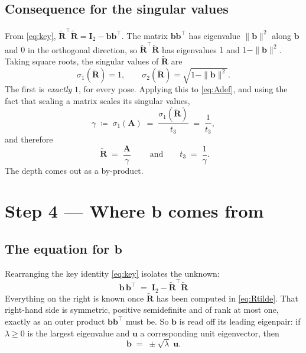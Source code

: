 \documentclass[11pt,a4paper]{article}
\theoremstyle{remark}
\newcommand{\Rtil}{\widetilde{\mathbf{R}}}
\newcommand{\Amat}{\mathbf{A}}
\newcommand{\Idm}{\mathbf{I}}
\newcommand{\bvec}{\mathbf{b}}
\newcommand{\uvec}{\mathbf{u}}
\begin{document}
\subsection{Consequence for the singular values}

From \eqref{eq:key}, $\Rtil^{\top}\Rtil = \Idm_2 - \bvec\bvec^{\top}$. The
matrix $\bvec\bvec^{\top}$ has eigenvalue $\|\bvec\|^2$ along $\bvec$ and $0$ in
the orthogonal direction, so $\Rtil^{\top}\Rtil$ has eigenvalues $1$ and
$1 - \|\bvec\|^2$. Taking square roots, the singular values of $\Rtil$ are
\begin{equation}
  \sigma_1(\Rtil) = 1,
  \qquad
  \sigma_2(\Rtil) = \sqrt{1 - \|\bvec\|^2}.
  \label{eq:sv}
\end{equation}
The first is \emph{exactly} $1$, for every pose. Applying this to
\eqref{eq:Adef}, and using the fact that scaling a matrix scales its singular
values,
\begin{equation}
  \gamma \;\coloneqq\; \sigma_1(\Amat)
  \;=\; \frac{\sigma_1(\Rtil)}{t_3}
  \;=\; \frac{1}{t_3},
  \label{eq:gamma}
\end{equation}
and therefore
\begin{equation}
  \boxed{\;
  \Rtil \;=\; \frac{\Amat}{\gamma}
  \;}
  \qquad \text{and} \qquad
  t_3 \;=\; \frac{1}{\gamma}.
  \label{eq:Rtilde}
\end{equation}
The depth comes out as a by-product.

\section{Step 4 --- Where $\bvec$ comes from}
\label{sec:b}

\subsection{The equation for $\bvec$}

Rearranging the key identity \eqref{eq:key} isolates the unknown:
\begin{equation}
  \boxed{\;
  \bvec\,\bvec^{\top} \;=\; \Idm_2 - \Rtil^{\top}\Rtil
  \;}
  \label{eq:bb}
\end{equation}
Everything on the right is known once $\Rtil$ has been computed in
\eqref{eq:Rtilde}. That right-hand side is symmetric, positive semidefinite and
of rank at most one, exactly as an outer product $\bvec\bvec^{\top}$ must be. So
$\bvec$ is read off its leading eigenpair: if $\lambda \ge 0$ is the largest
eigenvalue and $\uvec$ a corresponding unit eigenvector, then
\begin{equation}
  \bvec \;=\; \pm\sqrt{\lambda}\;\uvec .
  \label{eq:beig}
\end{equation}
\end{document}
